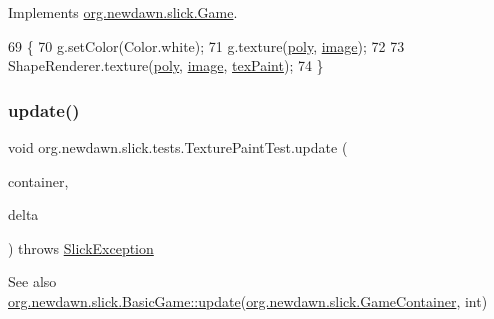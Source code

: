 Implements \mbox{\hyperlink{interfaceorg_1_1newdawn_1_1slick_1_1_game_af1a4670d43eb3ba04dfcf55ab1975b64}{org.\+newdawn.\+slick.\+Game}}.


\begin{DoxyCode}
69                                                                                   \{
70         g.setColor(Color.white);
71         g.texture(\mbox{\hyperlink{classorg_1_1newdawn_1_1slick_1_1tests_1_1_texture_paint_test_aeb688ec54d31a4ae76c2d8c9ffa2d57c}{poly}}, \mbox{\hyperlink{classorg_1_1newdawn_1_1slick_1_1tests_1_1_texture_paint_test_a305aa97ece19d7dd158aea1e8fe963c4}{image}});
72         
73         ShapeRenderer.texture(\mbox{\hyperlink{classorg_1_1newdawn_1_1slick_1_1tests_1_1_texture_paint_test_aeb688ec54d31a4ae76c2d8c9ffa2d57c}{poly}}, \mbox{\hyperlink{classorg_1_1newdawn_1_1slick_1_1tests_1_1_texture_paint_test_a305aa97ece19d7dd158aea1e8fe963c4}{image}}, \mbox{\hyperlink{classorg_1_1newdawn_1_1slick_1_1tests_1_1_texture_paint_test_abe40a374badc7dd300ac476ba5021f5d}{texPaint}});
74     \}
\end{DoxyCode}
\mbox{\label{classorg_1_1newdawn_1_1slick_1_1tests_1_1_texture_paint_test_a18372b798863b28f1f6918adeaa2133c}} 
\subsubsection{\texorpdfstring{update()}{update()}}
{\footnotesize\ttfamily void org.\+newdawn.\+slick.\+tests.\+Texture\+Paint\+Test.\+update (\begin{DoxyParamCaption}\item[{\mbox{\hyperlink{classorg_1_1newdawn_1_1slick_1_1_game_container}{Game\+Container}}}]{container,  }\item[{int}]{delta }\end{DoxyParamCaption}) throws \mbox{\hyperlink{classorg_1_1newdawn_1_1slick_1_1_slick_exception}{Slick\+Exception}}\hspace{0.3cm}{\ttfamily [inline]}}

\begin{DoxySeeAlso}{See also}
\mbox{\hyperlink{classorg_1_1newdawn_1_1slick_1_1_basic_game_acfe6fa05aef83bff1631af91a3e4bd20}{org.\+newdawn.\+slick.\+Basic\+Game\+::update}}(\mbox{\hyperlink{classorg_1_1newdawn_1_1slick_1_1_game_container}{org.\+newdawn.\+slick.\+Game\+Container}}, int) 
\end{DoxySeeAlso}


